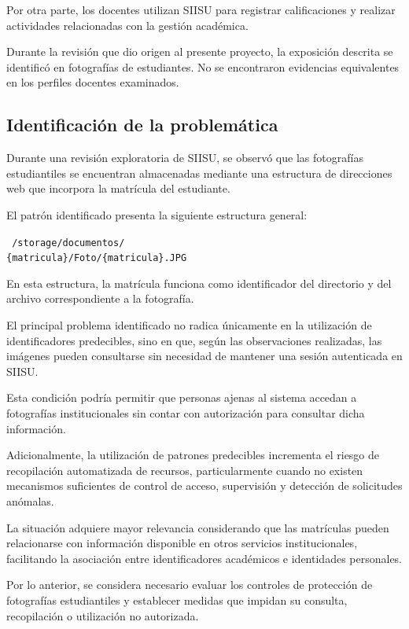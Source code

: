 \documentclass[12pt]{article}
\begin{document}
Por otra parte, los docentes utilizan SIISU
para registrar calificaciones y realizar
actividades relacionadas con la gestión
académica.

Durante la revisión que dio origen al
presente proyecto, la exposición descrita
se identificó en fotografías de estudiantes.
No se encontraron evidencias equivalentes
en los perfiles docentes examinados.

\subsection{Identificación de la problemática}

Durante una revisión exploratoria de SIISU,
se observó que las fotografías estudiantiles
se encuentran almacenadas mediante una
estructura de direcciones web que incorpora
la matrícula del estudiante.

El patrón identificado presenta la siguiente
estructura general:

\begin{center}
\small
\texttt{
/storage/documentos/\\
\{matricula\}/Foto/\{matricula\}.JPG
}
\end{center}

En esta estructura, la matrícula funciona
como identificador del directorio y del
archivo correspondiente a la fotografía.

El principal problema identificado no radica
únicamente en la utilización de identificadores
predecibles, sino en que, según las observaciones
realizadas, las imágenes pueden consultarse
sin necesidad de mantener una sesión
autenticada en SIISU.

Esta condición podría permitir que personas
ajenas al sistema accedan a fotografías
institucionales sin contar con autorización
para consultar dicha información.

Adicionalmente, la utilización de patrones
predecibles incrementa el riesgo de
recopilación automatizada de recursos,
particularmente cuando no existen
mecanismos suficientes de control de acceso,
supervisión y detección de solicitudes anómalas.

La situación adquiere mayor relevancia
considerando que las matrículas pueden
relacionarse con información disponible
en otros servicios institucionales,
facilitando la asociación entre
identificadores académicos e identidades
personales.

Por lo anterior, se considera necesario
evaluar los controles de protección de
fotografías estudiantiles y establecer
medidas que impidan su consulta,
recopilación o utilización no autorizada.
\end{document}
